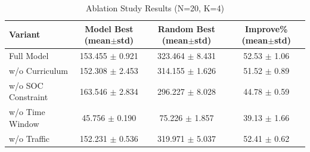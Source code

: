 \begin{table}[htbp]
  \centering
  \caption{Ablation Study Results (N=20, K=4)}
  \label{tab:ablation_n20k4}
  \begin{tabular}{lccc}
    \toprule
    Variant & Model Best (mean$\pm$std) & Random Best (mean$\pm$std) & Improve\% (mean$\pm$std) \\
    \midrule
    Full Model & 153.455 $\pm$ 0.921 & 323.464 $\pm$ 8.431 & 52.53 $\pm$ 1.06 \\
    w/o Curriculum & 152.308 $\pm$ 2.453 & 314.155 $\pm$ 1.626 & 51.52 $\pm$ 0.89 \\
    w/o SOC Constraint & 163.546 $\pm$ 2.834 & 296.227 $\pm$ 8.028 & 44.78 $\pm$ 0.59 \\
    w/o Time Window & 45.756 $\pm$ 0.190 & 75.226 $\pm$ 1.857 & 39.13 $\pm$ 1.66 \\
    w/o Traffic & 152.231 $\pm$ 0.536 & 319.971 $\pm$ 5.037 & 52.41 $\pm$ 0.62 \\
    \bottomrule
  \end{tabular}
\end{table}
